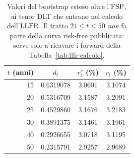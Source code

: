 \begin{table}[H]\centering\small
\caption{Valori del bootstrap esteso oltre l'$\mathrm{FSP}$, ai tenor DLT che entrano nel calcolo dell'$\mathrm{LLFR}$. Il tratto $21\le t\le 50$ \emph{non} fa parte della curva risk-free pubblicata: serve solo a ricavare i forward della Tabella~\ref{tab:llfr-calcolo}.}
\label{tab:bootstrap-esteso}\renewcommand{\arraystretch}{1.15}
\begin{tabular}{rccc}
\toprule
$t$ (anni) & $d_t$ & $r^c_t$ (\%) & $r_t$ (\%)\\
\midrule
\rowcolor{rowtint}15 & 0.6319078 & 3.0601 & 3.1074\\
20 & 0.5316709 & 3.1587 & 3.2091\\
\rowcolor{rowtint}25 & 0.4529860 & 3.1676 & 3.2183\\
30 & 0.3891375 & 3.1461 & 3.1961\\
\rowcolor{rowtint}40 & 0.2926655 & 3.0718 & 3.1195\\
50 & 0.2315791 & 2.9257 & 2.9689\\
\bottomrule
\end{tabular}
\end{table}
